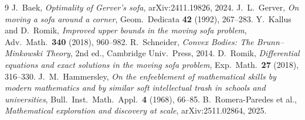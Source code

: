 \documentclass[11pt]{article}
\theoremstyle{definition}
\begin{document}
\begin{thebibliography}{9}
 J.~Baek, \emph{Optimality of Gerver's sofa}, arXiv:2411.19826, 2024.
 J.~L.~Gerver, \emph{On moving a sofa around a corner},
Geom.\ Dedicata \textbf{42} (1992), 267--283.
 Y.~Kallus and D.~Romik, \emph{Improved upper bounds in the moving sofa
problem}, Adv.\ Math.\ \textbf{340} (2018), 960--982.
 R.~Schneider, \emph{Convex Bodies: The Brunn--Minkowski Theory},
2nd ed., Cambridge Univ.\ Press, 2014.
 D.~Romik, \emph{Differential equations and exact solutions in the moving
sofa problem}, Exp.\ Math.\ \textbf{27} (2018), 316--330.
 J.~M.~Hammersley, \emph{On the enfeeblement of mathematical skills by
modern mathematics and by similar soft intellectual trash in schools and universities},
Bull.\ Inst.\ Math.\ Appl.\ \textbf{4} (1968), 66--85.
 B.~Romera-Paredes et al., \emph{Mathematical exploration and discovery at
scale}, arXiv:2511.02864, 2025.
\end{thebibliography}
\end{document}
